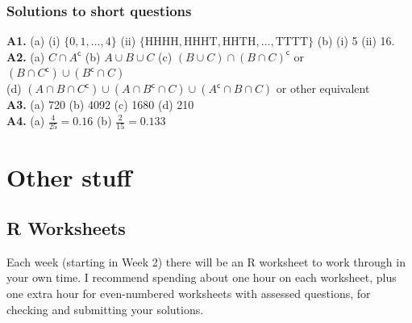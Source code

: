 \documentclass[
  a4paper,
]{book}
\theoremstyle{definition}
\theoremstyle{definition}
\theoremstyle{definition}
\theoremstyle{definition}
\theoremstyle{remark}
\begin{document}
\hypertarget{P2-short-sols}{%
\section*{Solutions to short questions}\label{P2-short-sols}}

\textbf{A1.} (a) (i) \(\{0,1,\dots, 4\}\) (ii) \(\{ \text{HHHH}, \text{HHHT}, \text{HHTH},\dots, \text{TTTT} \}\) (b) (i) 5 (ii) 16.\\
\textbf{A2.} (a) \(C \cap A^\mathsf{c}\) (b) \(A \cup B \cup C\) (c) \((B \cup C) \cap (B \cap C)^\mathsf{c}\) or \((B \cap C^\mathsf{c}) \cup (B^\mathsf{c}\cap C)\)\\
(d) \((A \cap B \cap C^\mathsf{c}) \cup (A \cap B^\mathsf{c}\cap C) \cup (A^\mathsf{c}\cap B \cap C)\) or other equivalent\\
\textbf{A3.} (a) 720 (b) 4092 (c) 1680 (d) 210\\
\textbf{A4.} (a) \(\frac{4}{25} = 0.16\) (b) \(\frac{2}{15} = 0.133\)

\hypertarget{part-other-stuff}{%
\part*{Other stuff}\label{part-other-stuff}}

\hypertarget{R}{%
\chapter*{R Worksheets}\label{R}}

Each week (starting in Week 2) there will be an R worksheet to work through in your own time. I recommend spending about one hour on each worksheet, plus one extra hour for even-numbered worksheets with assessed questions, for checking and submitting your solutions.
\end{document}
